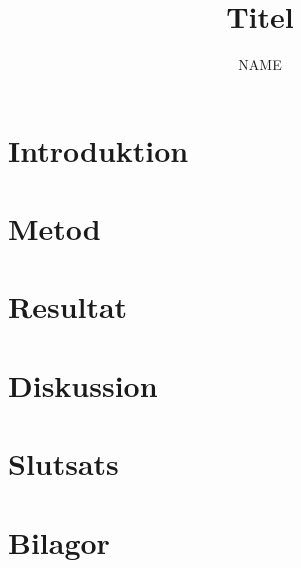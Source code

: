 \documentclass[a4paper, 10pt]{article}
\title{Titel} %
\author{NAME} %
\begin{document}
\thispagestyle{empty}
\setcounter{page}{0}
\firstpage
\newpage

\begin{abstract}
\lipsum[1-2]
\end{abstract}
\newpage
    
\tableofcontents
\newpage

\begin{multicols}{2}
\section{Introduktion}
\section{Metod}
\section{Resultat}
\section{Diskussion}
\section{Slutsats}
\end{multicols}
\printbibliography
\section*{Bilagor}
\appendix
% 
\end{document}
